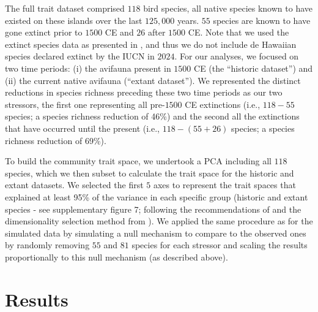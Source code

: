 \documentclass[12pt,letterpaper]{article}
\begin{document}
The full trait dataset comprised $118$ bird species, all native species known to have existed on these islands over the last $125,000$ years.
$55$ species are known to have gone extinct prior to $1500$ CE and $26$ after $1500$ CE.
Note that we used the extinct species data as presented in \cite{matthews2023global}, and thus we do not include de Hawaiian species declared extinct by the IUCN in $2024$.
For our analyses, we focused on two time periods: (i) the avifauna present in $1500$ CE (the ``historic dataset'') and (ii) the current native avifauna (``extant dataset'').
We represented the distinct reductions in species richness preceding these two time periods as our two stressors, the first one representing all pre-$1500$ CE extinctions (i.e., $118-55$ species; a species richness reduction of 46\%) and the second all the extinctions that have occurred until the present (i.e., $118-(55+26)$ species; a species richness reduction of 69\%).

To build the community trait space, we undertook a PCA including all $118$ species, which we then subset to calculate the trait space for the historic and extant datasets.
We selected the first $5$ axes to represent the trait spaces that explained at least 95\% of the variance in each specific group (historic and extant species - see supplementary figure 7; following the recommendations of \citealt{pigot2020macroevolutionary} and the dimensionality selection method from \citealt{guillerme2023innovation}).
We applied the same procedure as for the simulated data by simulating a null mechanism to compare to the observed ones by randomly removing $55$ and $81$ species for each stressor and scaling the results proportionally to this null mechanism (as described above).


\section{Results}
\end{document}
